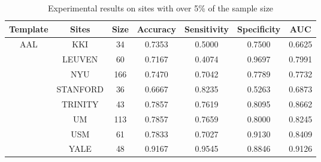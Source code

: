 \documentclass[journal,twoside,web]{ieeecolor}
\begin{document}
\begin{table}
	\centering
	\caption{Experimental results on sites with over 5\% of the sample size}
	\label{Table5}
	\tabcolsep=0.8cm
	\begin{tabular*}{\textwidth}{ccccccc} 
		\toprule
		\multicolumn{1}{l}{\textbf{Template}} & \textbf{Sites} & \textbf{Size} & \textbf{Accuracy} & \textbf{Sensitivity} & \textbf{Specificity} & \textbf{AUC}  \\ 
		\midrule
		\multirow{9}{*}{AAL}                  & KKI            & 34            & 0.7353            & 0.5000               & 0.7500               & 0.6625        \\
		& LEUVEN         & 60            & 0.7167            & 0.4074               & 0.9697               & 0.7991        \\
		& NYU            & 166           & 0.7470            & 0.7042               & 0.7789               & 0.7732        \\
		& STANFORD       & 36            & 0.6667            & 0.8235               & 0.5263               & 0.6873        \\
		& TRINITY        & 43            & 0.7857            & 0.7619               & 0.8095               & 0.8662        \\
		& UM             & 113           & 0.7857            & 0.7659               & 0.8000               & 0.8245        \\
		& USM            & 61            & 0.7833            & 0.7027               & 0.9130               & 0.8409        \\
		& YALE           & 48            & 0.9167            & 0.9545               & 0.8846               & 0.9126        \\ 


\end{tabular*}
\end{table}
\end{document}
